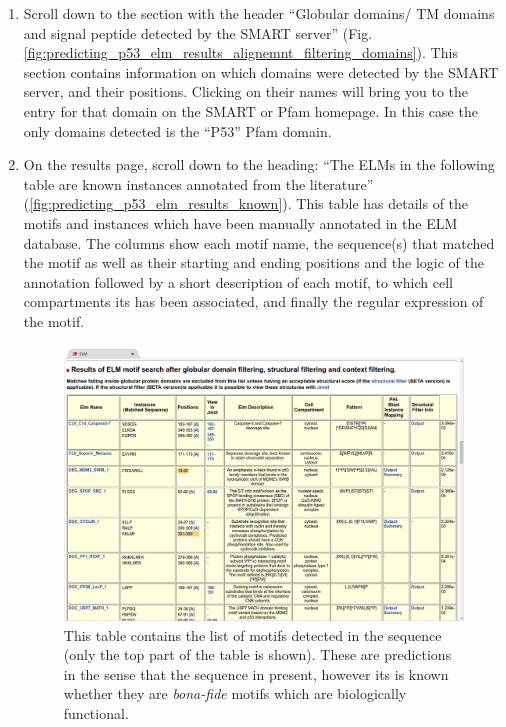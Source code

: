 \documentclass[12pt]{article}
\begin{document}
\begin{enumerate}
\item Scroll down to the section with the header ``Globular domains/ TM domains
	and signal peptide detected by the SMART server''
	(Fig. \ref{fig:predicting_p53_elm_results_alignemnt_filtering_domains}).
	This section contains information on which domains were detected by the
	SMART server, and their positions. Clicking on their names will bring
	you to the entry for that domain on the SMART or Pfam homepage.
	In this case the only domains detected is the ``P53'' Pfam domain.

\item On the results page, scroll down to the heading: ``The ELMs in the
	following table are known instances annotated from the literature''
	(\ref{fig:predicting_p53_elm_results_known}).
	This table has details of the motifs and instances which have been
	manually annotated in the ELM database. The columns show each motif
	name, the sequence(s) that matched the motif as well as their starting
	and ending positions and the logic of the annotation followed by a
	short description of each motif, to which cell compartments its has
	been associated, and finally the regular expression of the motif.

\begin{figure}[h!]
	\centering
	\includegraphics[width=\textwidth]{Figures/predicting_p53/elm_results_motifs.png}
	\caption{
	This table contains the list of motifs detected in the sequence (only
	the top part of the table is shown). These are predictions in the sense
	that the sequence in present, however its is known whether they are
	\emph{bona-fide} motifs which are biologically functional.
	}
	\label{fig:predicting_p53_elm_results_motifs}
\end{figure}


\end{enumerate}
\end{document}
